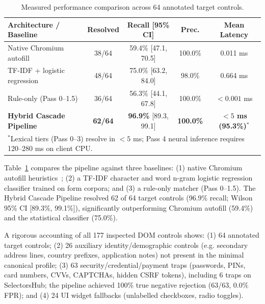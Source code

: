 \documentclass[11pt,runningheads,a4paper]{llncs}
\begin{document}
\begin{table}[t]
\caption{Measured performance comparison across 64 annotated target controls.}
\label{tab:baseline}
\centering
\scriptsize
\setlength{\tabcolsep}{4.5pt}
\begin{tabular}{p{3.2cm}cccc}
\toprule
\textbf{Architecture / Baseline} & \textbf{Resolved} & \textbf{Recall [95\% CI]} & \textbf{Prec.} & \textbf{Mean Latency} \\
\midrule
Native Chromium autofill~\cite{chromium} & 38/64 & 59.4\% [47.1, 70.5] & 100.0\% & 0.011 ms \\
TF-IDF + logistic regression & 48/64 & 75.0\% [63.2, 84.0] & 98.0\% & 0.664 ms \\
Rule-only (Pass 0--1.5) & 36/64 & 56.3\% [44.1, 67.8] & 100.0\% & $<0.001$ ms \\
\textbf{Hybrid Cascade Pipeline} & \textbf{62/64} & \textbf{96.9\%} [89.3, 99.1] & \textbf{100.0\%} & \textbf{$<5$ ms (95.3\%)$^{*}$} \\
\bottomrule
\multicolumn{5}{l}{\tiny $^{*}$Lexical tiers (Pass 0--3) resolve in $<5$ ms; Pass 4 neural inference requires 120--280 ms on client CPU.}
\end{tabular}
\end{table}

Table~\ref{tab:baseline} compares the pipeline against three baselines: (1) native Chromium autofill heuristics~\cite{chromium}; (2) a TF-IDF character and word n-gram logistic regression classifier trained on form corpora; and (3) a rule-only matcher (Pass 0--1.5). The Hybrid Cascade Pipeline resolved 62 of 64 target controls (96.9\% recall; Wilson 95\% CI [89.3\%, 99.1\%]), significantly outperforming Chromium autofill (59.4\%) and the statistical classifier (75.0\%).

A rigorous accounting of all 177 inspected DOM controls shows: (1) 64 annotated target controls; (2) 26 auxiliary identity/demographic controls (e.g. secondary address lines, country prefixes, application notes) not present in the minimal canonical profile; (3) 63 security/credential/payment traps (passwords, PINs, card numbers, CVVs, CAPTCHAs, hidden CSRF tokens), including 6 traps on SelectorsHub; the pipeline achieved 100\% true negative rejection (63/63, 0.0\% FPR); and (4) 24 UI widget fallbacks (unlabelled checkboxes, radio toggles).
\end{document}
